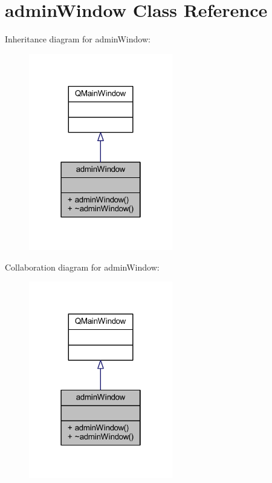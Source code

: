 \hypertarget{classadmin_window}{}\section{admin\+Window Class Reference}
\label{classadmin_window}


Inheritance diagram for admin\+Window\+:\nopagebreak
\begin{figure}[H]
\begin{center}
\leavevmode
\includegraphics[width=178pt]{classadmin_window__inherit__graph}
\end{center}
\end{figure}


Collaboration diagram for admin\+Window\+:\nopagebreak
\begin{figure}[H]
\begin{center}
\leavevmode
\includegraphics[width=178pt]{classadmin_window__coll__graph}
\end{center}
\end{figure}
